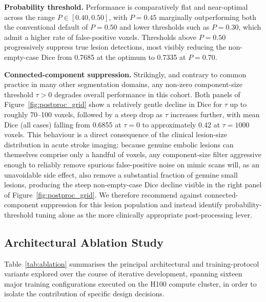 \documentclass[pdflatex,sn-mathphys-num]{sn-jnl}
\begin{document}
\textbf{Probability threshold.} Performance is comparatively flat and
near-optimal across the range $P \in [0.40,0.50]$, with $P=0.45$
marginally outperforming both the conventional default of $P=0.50$
and lower thresholds such as $P=0.30$, which admit a higher rate of
false-positive voxels. Thresholds above $P=0.50$ progressively
suppress true lesion detections, most visibly reducing the
non-empty-case Dice from 0.7685 at the optimum to 0.7335 at $P=0.70$.

\textbf{Connected-component suppression.} Strikingly, and contrary to
common practice in many other segmentation domains, any non-zero
component-size threshold $\tau>0$ degrades overall performance in this
cohort. Both panels of Figure~\ref{fig:postproc_grid} show a
relatively gentle decline in Dice for $\tau$ up to roughly 70--100
voxels, followed by a steep drop as $\tau$ increases further, with
mean Dice (all cases) falling from 0.6855 at $\tau=0$ to
approximately 0.42 at $\tau=1000$ voxels. This behaviour is a direct
consequence of the clinical lesion-size distribution in acute stroke
imaging: because genuine embolic lesions can themselves comprise only
a handful of voxels, any component-size filter aggressive enough to
reliably remove spurious false-positive noise on mimic scans will,
as an unavoidable side effect, also remove a substantial fraction of
genuine small lesions, producing the steep non-empty-case Dice decline
visible in the right panel of Figure~\ref{fig:postproc_grid}. We
therefore recommend against connected-component suppression for this
lesion population and instead identify probability-threshold tuning
alone as the more clinically appropriate post-processing lever.

\subsection{Architectural Ablation Study}\label{ssec:ablation}
Table~\ref{tab:ablation} summarises the principal architectural and
training-protocol variants explored over the course of iterative
development, spanning sixteen major training configurations executed
on the H100 compute cluster, in order to isolate the contribution of
specific design decisions.
\end{document}
